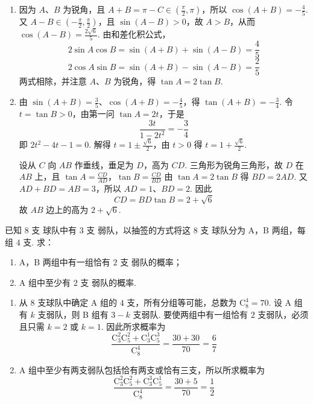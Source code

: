 \begin{solution}
\begin{enumerate}
\item 因为 \(A\)、\(B\) 为锐角，且 \(A+B=\pi-C\in\left(\frac\pi2,\pi\right)\)，所以 \(\cos(A+B)=-\frac45\). 又 \(A-B\in\left(-\frac\pi2,\frac\pi2\right)\)，且 \(\sin(A-B)>0\)，故 \(A>B\)，从而 \(\cos(A-B)=\frac{2\sqrt6}{5}\). 由和差化积公式，
\[
2\sin A\cos B=\sin(A+B)+\sin(A-B)=\frac45
\]
\[
2\cos A\sin B=\sin(A+B)-\sin(A-B)=\frac25
\]
两式相除，并注意 \(A\)、\(B\) 为锐角，得 \(\tan A=2\tan B\).

\item 由 \(\sin(A+B)=\frac35\)、\(\cos(A+B)=-\frac45\)，得 \(\tan(A+B)=-\frac34\). 令 \(t=\tan B>0\)，由第一问 \(\tan A=2t\)，于是
\[
\frac{3t}{1-2t^2}=-\frac34
\]
即 \(2t^2-4t-1=0\). 解得 \(t=1\pm\frac{\sqrt6}{2}\)，由 \(t>0\) 得 \(t=1+\frac{\sqrt6}{2}\).

设从 \(C\) 向 \(AB\) 作垂线，垂足为 \(D\)，高为 \(CD\). 三角形为锐角三角形，故 \(D\) 在 \(AB\) 上，且
\(\tan A=\frac{CD}{AD}\)，\(\tan B=\frac{CD}{BD}\)
由 \(\tan A=2\tan B\) 得 \(BD=2AD\). 又 \(AD+BD=AB=3\)，所以 \(AD=1\)、\(BD=2\). 因此
\[
CD=BD\tan B=2+\sqrt6
\]
故 \(AB\) 边上的高为 \(2+\sqrt6\).
\end{enumerate}
\end{solution}

\begin{problem}
已知 \(8\text{ 支}\) 球队中有 \(3\text{ 支}\) 弱队，以抽签的方式将这 \(8\text{ 支}\) 球队分为 A，B 两组，每组 \(4\text{ 支}\). 求：

\begin{enumerate}
\item A，B 两组中有一组恰有 \(2\text{ 支}\) 弱队的概率；
\item A 组中至少有 \(2\text{ 支}\) 弱队的概率.
\end{enumerate}
\end{problem}

\begin{solution}
\begin{enumerate}
\item 从 \(8\) 支球队中确定 A 组的 \(4\) 支，所有分组等可能，总数为 \(\mathrm C_8^4=70\). 设 A 组有 \(k\) 支弱队，则 B 组有 \(3-k\) 支弱队. 要使两组中有一组恰有 \(2\) 支弱队，必须且只需 \(k=2\) 或 \(k=1\). 因此所求概率为
\[
\frac{\mathrm C_3^2\mathrm C_5^2+\mathrm C_3^1\mathrm C_5^3}{\mathrm C_8^4}
=\frac{30+30}{70}=\frac67
\]

\item A 组中至少有两支弱队包括恰有两支或恰有三支，所以所求概率为
\[
\frac{\mathrm C_3^2\mathrm C_5^2+\mathrm C_3^3\mathrm C_5^1}{\mathrm C_8^4}
=\frac{30+5}{70}=\frac12
\]
\end{enumerate}
\end{solution}


